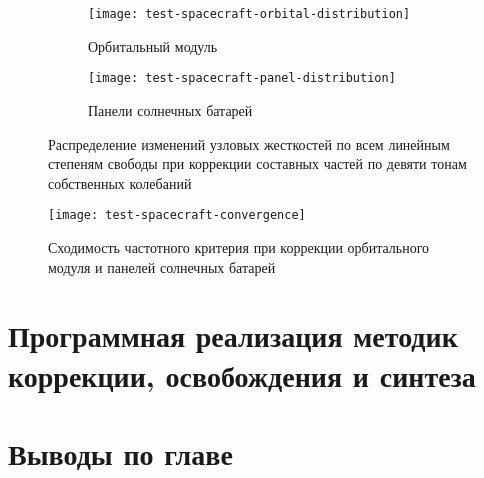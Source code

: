 \begin{figure}[!htb]
	\centering
	\begin{subfigure}[t]{\sfSpacecraft}
		\centering
		\texttt{[image: test-spacecraft-orbital-distribution]}
		\caption{Орбитальный модуль} \label{subfig:test-orbital-distribution} 
	\end{subfigure}
	\hfill
	\begin{subfigure}[t]{\sfSpacecraft}
		\centering
		\texttt{[image: test-spacecraft-panel-distribution]}
		\caption{Панели солнечных батарей} \label{subfig:test-panel-distribution} 
	\end{subfigure} 
	\caption{Распределение изменений узловых жесткостей по всем линейным степеням свободы при коррекции составных частей по девяти тонам собственных колебаний} 
\end{figure}

\begin{figure}[!htb]
	\centering
	\texttt{[image: test-spacecraft-convergence]}
	\caption{Сходимость частотного критерия при коррекции орбитального модуля и панелей солнечных батарей}  \label{fig:test-spacecraft-convergence}
\end{figure}

\section{Программная реализация методик коррекции, освобождения и синтеза}


\section{Выводы по главе \thechapter}